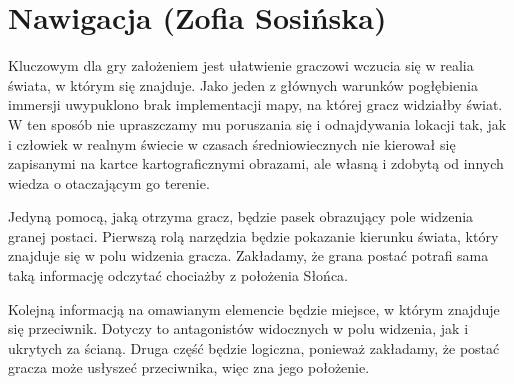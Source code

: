\section{Nawigacja (Zofia Sosińska)}\label{chap:naw}

Kluczowym dla gry założeniem jest ułatwienie graczowi wczucia się w realia świata, w którym się znajduje. Jako jeden z głównych warunków pogłębienia immersji uwypuklono brak implementacji mapy, na której gracz widziałby świat. W ten sposób nie upraszczamy mu poruszania się i odnajdywania lokacji tak, jak i człowiek w realnym świecie w czasach średniowiecznych nie kierował się zapisanymi na kartce kartograficznymi obrazami, ale własną i zdobytą od innych wiedza o otaczającym go terenie. 

Jedyną pomocą, jaką otrzyma gracz, będzie pasek obrazujący pole widzenia granej postaci. Pierwszą rolą narzędzia będzie pokazanie kierunku świata, który znajduje się w polu widzenia gracza. Zakładamy, że grana postać potrafi sama taką informację odczytać chociażby z położenia Słońca.

Kolejną informacją na omawianym elemencie będzie miejsce, w którym znajduje się przeciwnik. Dotyczy to antagonistów widocznych w polu widzenia, jak i ukrytych za ścianą. Druga część będzie 
logiczna, ponieważ zakładamy, że postać gracza może usłyszeć przeciwnika, więc zna jego położenie.
